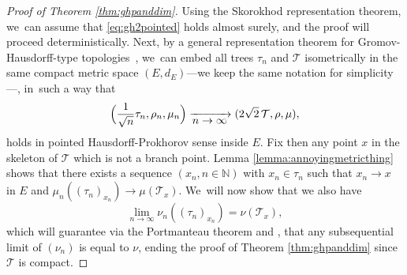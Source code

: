 \documentclass[11pt]{article}
\newcommand{\N}{\mathbb{N}}
\newcommand{\T}{\mathcal{T}}\let\CRT\T\let\tbr\T
\theoremstyle{definition}
\begin{document}
\begin{proof}[Proof of Theorem \ref{thm:ghpanddim}]
Using the Skorokhod representation theorem, we~can assume that \eqref{eq:gh2pointed} holds almost surely, and the proof will proceed deterministically. Next, by a general representation theorem for Gromov-Hausdorff-type topologies~\cite[Lem.\,2.5]{khezeli2023unified}, we~can
embed all trees $\tau_n$ and $ \mathcal{T}$ isometrically in the same compact
metric space $(E,d_E)$---we keep the same notation for simplicity---, in~such a way that
\begin{equation*}
\Bigl(\frac{1}{\sqrt{n}} \tau_n,\rho_n,\mu_n\Bigr) \xrightarrow[\textstyle n\to\infty]{} (2\sqrt{2}\,\T,\rho,\mu),
\end{equation*}
holds in pointed Hausdorff-Prokhorov sense inside $E$. Fix then any point $x$ in the skeleton of $\T$ which is not a branch point. Lemma \ref{lemma:annoyingmetricthing} shows that there exists a sequence $(x_n,n\in\N)$ with $x_n\in\tau_n$ such that $x_n \to x$ in $E$ and $\mu_n((\tau_n)_{x_n}) \to \mu(\T_x)$. We~will now show that we also have
\begin{equation}\label{eq:GHPlimofnu} \lim_{n \to \infty} \nu_n((\tau_n)_{x_n})= \nu(\T_x),\end{equation}
which will guarantee via the Portmanteau theorem and \cite[Prop.\,1]{Steph13}, that any subsequential limit of $(\nu_n)$ is equal to $\nu$, ending the proof of Theorem \ref{thm:ghpanddim} since $ \mathcal{T}$ is compact.


\end{proof}
\end{document}
